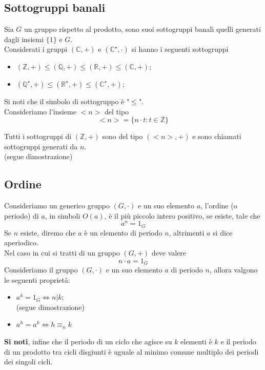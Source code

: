 \begin{flushleft}
\subsection{Sottogruppi banali}
Sia $G$ un gruppo rispetto al prodotto, sono suoi sottogruppi banali quelli generati dagli insiemi $\{1\}$ e $G$.\\
Considerati i gruppi $(\mathbb{C}, +)$ e $(\mathbb{C}^\star, \cdot)$ si hanno i seguenti sottogruppi
\begin{itemize}
    \item[] $(\mathbb{Z}, +)\leq (\mathbb{Q}, +) \leq (\mathbb{R}, +) \leq (\mathbb{C}, +)$;
    \item[] $(\mathbb{Q}^\star, +) \leq (\mathbb{R}^\star, +) \leq (\mathbb{C}^\star, +)$;
\end{itemize}
Si noti che il simbolo di sottogruppo è "$\leq$".\\
Consideriamo l'insieme $<n>$ del tipo
\[<n> = \{n\cdot t: t\in \mathbb{Z}\}\]

Tutti i sottogruppi di $(\mathbb{Z}, +)$ sono del tipo $(<n>, +)$ e sono chiamati sottogruppi generati da $n$.\\
(segue dimostrazione)
\\ \vspace{300px}

\subsection{Ordine}
Consideriamo un generico gruppo $(G,\cdot)$ e un suo elemento $a$, l'ordine (o periodo) di $a$, in simboli $O(a)$, è il più piccolo intero positivo, se esiste, tale che
\[a^n = 1_G\]
Se $n$ esiste, diremo che $a$ è un elemento di periodo $n$, altrimenti $a$ si dice aperiodico.\\
Nel caso in cui si tratti di un gruppo $(G, +)$ deve valere
\[n\cdot a = 1_G\]
Consideriamo il gruppo $(G, \cdot)$ e un suo elemento $a$ di periodo $n$, allora valgono le seguenti proprietà:
\begin{itemize}
    \item $a^k = 1_G \Leftrightarrow n|k$;\\
    (segue dimostrazione)
    \\ \vspace{300px}
    
    \item $a^h = a^k \Leftrightarrow h\equiv_n k$
\end{itemize}
\textbf{Si noti}, infine che il periodo di un ciclo che agisce su $k$ elementi è $k$ e il periodo di un prodotto tra cicli disgiunti è uguale al minimo comune multiplo dei periodi dei singoli cicli.


\end{flushleft}
